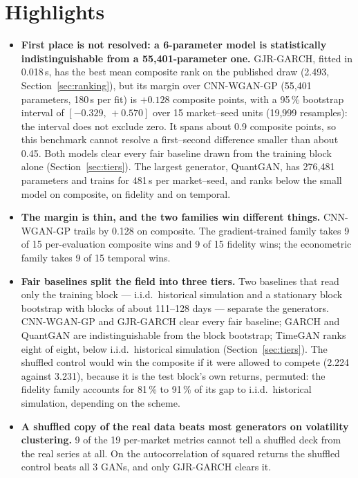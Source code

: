 \documentclass[11pt,a4paper]{article}
\makeatletter
\DeclareRobustCommand{\_}{\ifmmode\nfss@text{\textunderscore}\else\textunderscore\allowbreak\fi}
\makeatother
\begin{document}
\section{Highlights}
\label{sec:highlights}
\begin{itemize}[leftmargin=1.3em,itemsep=6pt]
\item \textbf{First place is not resolved: a 6-parameter model is statistically indistinguishable from a 55{,}401-parameter one.} GJR-GARCH, fitted in 0.018\,s, has the best mean composite rank on the published draw (2.493, Section~\ref{sec:ranking}), but its margin over CNN-WGAN-GP (55{,}401 parameters, 180\,s per fit) is $+0.128$ composite points, with a 95\,\% bootstrap interval of $[-0.329,\,+0.570]$ over 15 market--seed units (19{,}999 resamples): the interval does not exclude zero. It spans about 0.9 composite points, so this benchmark cannot resolve a first--second difference smaller than about 0.45. Both models clear every fair baseline drawn from the training block alone (Section~\ref{sec:tiers}). The largest generator, QuantGAN, has 276,481 parameters and trains for 481\,s per market--seed, and ranks below the small model on composite, on fidelity and on temporal.
\item \textbf{The margin is thin, and the two families win different things.} CNN-WGAN-GP trails by 0.128 on composite. The gradient-trained family takes 9 of 15 per-evaluation composite wins and 9 of 15 fidelity wins; the econometric family takes 9 of 15 temporal wins.
\item \textbf{Fair baselines split the field into three tiers.} Two baselines that read only the training block --- i.i.d.\ historical simulation and a stationary block bootstrap with blocks of about 111--128 days --- separate the generators. CNN-WGAN-GP and GJR-GARCH clear every fair baseline; GARCH and QuantGAN are indistinguishable from the block bootstrap; TimeGAN ranks eight of eight, below i.i.d.\ historical simulation (Section~\ref{sec:tiers}). The shuffled control would win the composite if it were allowed to compete (2.224 against 3.231), because it is the test block's own returns, permuted: the fidelity family accounts for 81\,\% to 91\,\% of its gap to i.i.d.\ historical simulation, depending on the scheme.
\item \textbf{A shuffled copy of the real data beats most generators on volatility clustering.} 9 of the 19 per-market metrics cannot tell a shuffled deck from the real series at all. On the autocorrelation of squared returns the shuffled control beats all 3 GANs, and only GJR-GARCH clears it.

\end{itemize}
\end{document}
